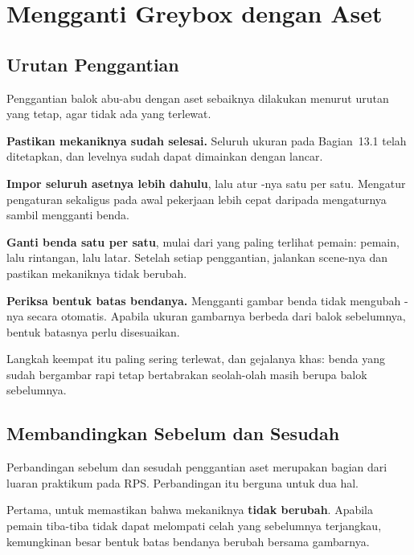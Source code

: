 \section{Mengganti Greybox dengan Aset}
\label{sec:ganti-aset}

\subsection{Urutan Penggantian}

Penggantian balok abu-abu dengan aset sebaiknya dilakukan menurut urutan yang
tetap, agar tidak ada yang terlewat.

\begin{langkah}
  \item \textbf{Pastikan mekaniknya sudah selesai.} Seluruh ukuran pada
        Bagian~13.1 telah ditetapkan, dan levelnya sudah dapat dimainkan
        dengan lancar.
  \item \textbf{Impor seluruh asetnya lebih dahulu}, lalu atur
        -nya satu per satu. Mengatur pengaturan
        sekaligus pada awal pekerjaan lebih cepat daripada mengaturnya
        sambil mengganti benda.
  \item \textbf{Ganti benda satu per satu}, mulai dari yang paling terlihat
        pemain: pemain, lalu rintangan, lalu latar. Setelah setiap
        penggantian, jalankan scene-nya dan pastikan mekaniknya tidak berubah.
  \item \textbf{Periksa bentuk batas bendanya.} Mengganti gambar benda tidak
        mengubah -nya secara otomatis. Apabila ukuran
        gambarnya berbeda dari balok sebelumnya, bentuk batasnya perlu
        disesuaikan.
\end{langkah}

Langkah keempat itu paling sering terlewat, dan gejalanya khas: benda yang
sudah bergambar rapi tetap bertabrakan seolah-olah masih berupa balok
sebelumnya.

\subsection{Membandingkan Sebelum dan Sesudah}

Perbandingan sebelum dan sesudah penggantian aset merupakan bagian dari luaran
praktikum pada RPS. Perbandingan itu berguna untuk dua hal.

Pertama, untuk memastikan bahwa mekaniknya \textbf{tidak berubah}. Apabila
pemain tiba-tiba tidak dapat melompati celah yang sebelumnya terjangkau,
kemungkinan besar bentuk batas bendanya berubah bersama gambarnya.

